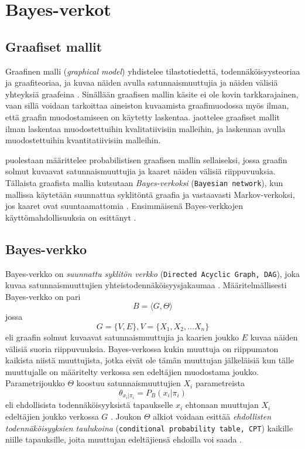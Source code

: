 \chapter{Bayes-verkot\label{bayes}}

\section{Graafiset mallit}
Graafinen malli (\emph{graphical model}) yhdistelee tilastotiedettä, todennäköisyysteoriaa ja graafiteoriaa, ja kuvaa näiden avulla satunnaismuuttujia ja näiden välisiä yhteyksiä graafeina \citep{jordan_graphical_2004}. Sinällään graafisen mallin käsite ei ole kovin tarkkarajainen, vaan sillä voidaan tarkoittaa aineiston kuvaamista graafimuodossa myös ilman, että graafin muodostamiseen on käytetty laskentaa. \citet{ramsahai_connecting_2020} jaottelee graafiset mallit ilman laskentaa muodostettuihin kvalitatiivisiin malleihin, ja laskennan avulla muodostettuihin kvantitatiivisiin malleihin. 

\citet{jordan_graphical_2004} puolestaan määrittelee probabilistisen graafisen mallin sellaiseksi, jossa graafin solmut kuvaavat satunnaismuuttujia ja kaaret näiden välisiä riippuvuuksia. Tällaista graafista mallia kutsutaan \emph{Bayes-verkoksi} (\texttt{Bayesian network}), kun mallissa käytetään suunnattua syklitöntä graafia ja vastaavasti Markov-verkoksi, jos kaaret ovat suuntaamattomia \citep{ruggeri_bayesian_2008}. Ensimmäisenä Bayes-verkkojen käyttömahdollisuuksia on esittänyt \citet{pearl_fusion_1986}.

\section{Bayes-verkko}
Bayes-verkko on \emph{suunnattu syklitön verkko} (\texttt{Directed Acyclic Graph, DAG}), joka kuvaa satunnaismuuttujien yhteistodennäköisyysjakaumaa \citep{ruggeri_bayesian_2008}. Määritelmällisesti Bayes-verkko on pari 
$$
    B = \langle G, \Theta \rangle
$$
jossa 
$$
    G = \{V, E\}, V = \{X_1, X_2,\ldots X_n\}
$$ 
eli graafin solmut kuvaavat satunnaismuuttujia ja kaarien joukko $E$ kuvaa näiden välisiä suoria riippuvuuksia. Bayes-verkossa kukin muuttuja on riippumaton kaikista niistä muuttujista, jotka eivät ole tämän muuttujan jälkeläisiä kun tälle muuttujalle on määritelty verkossa sen edeltäjien muodostama joukko. Parametrijoukko $\Theta$ koostuu satunnaismuuttujien $X_i$ parametreista 
$$
    \theta_{x_i|\pi_i} = P_B(x_i|\pi_i)
$$ 
eli ehdollisista todennäköisyyksistä tapaukselle $x_i$ ehtonaan muuttujan $X_i$ edeltäjien joukko verkossa $G$ \citep{ruggeri_bayesian_2008, myllymaki_bayes-verkkojen_1998}. Joukon $\Theta$ alkiot voidaan esittää \emph{ehdollisten todennäköisyyksien taulukoina}  (\texttt{conditional probability table, CPT}) kaikille niille tapauksille, joita muuttujan edeltäjiensä ehdoilla voi saada \citep{zhang_brief_2019}.

